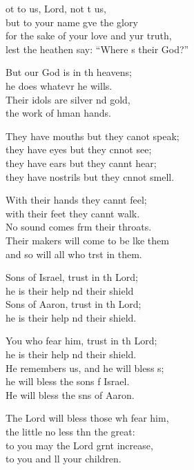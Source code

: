 \settowidth{\versewidth}{for the sake of your love and your truth, *}
\begin{psalmverse}%
  \begin{patverse}
ot to us, Lord, not t us,\Med\\
but to your name gve the glory\\
for the sake of your love and yur truth,\Med\\
lest the heathen say: “Where s their God?”

But our God is in th heavens;\Med\\
he does whatevr he wills.\\
Their idols are silver nd gold,\Med\\
the work of hman hands.

They have mouths but they canot speak;\Med\\
they have eyes but they cnnot see;\\
they have ears but they cannt hear;\Med\\
they have nostrils but they cnnot smell.

With their hands they cannt feel;\Flex\\
with their feet they cannt walk.\Med\\
No sound comes frm their throats.\\
Their makers will come to be l\pointup{\i}ke them\Med\\
and so will all who trst in them.

Sons of Israel, trust in th Lord;\Med\\
he is their help nd their shield\\
Sons of Aaron, trust in th Lord;\Med\\
he is their help nd their shield.

You who fear him, trust in th Lord;\Med\\
he is their help nd their shield.\\
He remembers us, and he will bless s;\Flex\\
he will bless the sons f Israel.\Med\\
He will bless the sns of Aaron.

The Lord will bless those wh fear him,\Med\\
the little no less thn the great:\\
to you may the Lord grnt increase,\Med\\
to you and ll your children.


\end{patverse}
\end{psalmverse}
